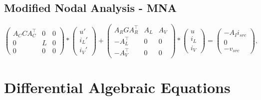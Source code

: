 	\subsection{Modified Nodal Analysis - MNA}
	\begin{frame}
		\begin{equation}
			\label{MNA_Matrixform}
			\begin{pmatrix}
				A_C C A_C^\top & 0 & 0 \\
				0 & L & 0 \\
				0 & 0 & 0
			\end{pmatrix}
			*
			\begin{pmatrix}
				u' \\
				i_L' \\
				i_V'
			\end{pmatrix}
			+
			\begin{pmatrix}
				A_R G A_R^\top & A_L & A_V \\
				-A_L^\top & 0 & 0 \\
				-A_V^\top & 0 & 0 
			\end{pmatrix}
			*
			\begin{pmatrix}
				u \\
				i_L \\
				i_V
			\end{pmatrix}
			=
			\begin{pmatrix}
				-A_I i_{src} \\
				0 \\
				-v_{src}
			\end{pmatrix} , 
		\end{equation}
	\end{frame}

\section{Differential Algebraic Equations}
